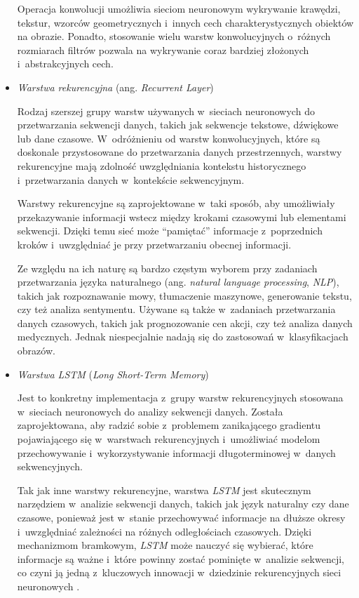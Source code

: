 \begin{itemize}
        Operacja konwolucji umożliwia sieciom neuronowym wykrywanie krawędzi, tekstur, wzorców geometrycznych i~innych cech charakterystycznych obiektów na obrazie.
        Ponadto, stosowanie wielu warstw konwolucyjnych o~różnych rozmiarach filtrów pozwala na wykrywanie coraz bardziej złożonych i~abstrakcyjnych cech.

  \item \emph{Warstwa rekurencyjna} (ang. \emph{Recurrent Layer})

        Rodzaj szerszej grupy warstw używanych w~sieciach neuronowych do przetwarzania sekwencji danych, takich jak sekwencje tekstowe, dźwiękowe lub dane czasowe.
        W~odróżnieniu od warstw konwolucyjnych, które są doskonale przystosowane do przetwarzania danych przestrzennych, warstwy rekurencyjne mają zdolność uwzględniania kontekstu historycznego i~przetwarzania danych w~kontekście sekwencyjnym.

        Warstwy rekurencyjne są zaprojektowane w~taki sposób, aby umożliwiały przekazywanie informacji wstecz między krokami czasowymi lub elementami sekwencji.
        Dzięki temu sieć może ``pamiętać'' informacje z~poprzednich kroków i~uwzględniać je przy przetwarzaniu obecnej informacji.

        Ze względu na ich naturę są bardzo częstym wyborem przy zadaniach przetwarzania języka naturalnego (ang. \emph{natural language processing}, \emph{NLP}), takich jak rozpoznawanie mowy, tłumaczenie maszynowe, generowanie tekstu, czy też analiza sentymentu.
        Używane są także w~zadaniach przetwarzania danych czasowych, takich jak prognozowanie cen akcji, czy też analiza danych medycznych.
        Jednak niespecjalnie nadają się do zastosowań w~klasyfikacjach obrazów.

  \item \emph{Warstwa LSTM} (\emph{Long Short-Term Memory})

        Jest to konkretny implementacja z~grupy warstw rekurencyjnych stosowana w~sieciach neuronowych do analizy sekwencji danych.
        Została zaprojektowana, aby radzić sobie z~problemem zanikającego gradientu pojawiającego się w~warstwach rekurencyjnych i~umożliwiać modelom przechowywanie i~wykorzystywanie informacji długoterminowej w~danych sekwencyjnych.

        Tak jak inne warstwy rekurencyjne, warstwa \emph{LSTM} jest skutecznym narzędziem w~analizie sekwencji danych, takich jak język naturalny czy dane czasowe, ponieważ jest w~stanie przechowywać informacje na dłuższe okresy i~uwzględniać zależności na różnych odległościach czasowych.
        Dzięki mechanizmom bramkowym, \emph{LSTM} może nauczyć się wybierać, które informacje są ważne i~które powinny zostać pominięte w~analizie sekwencji, co czyni ją jedną z~kluczowych innowacji w~dziedzinie rekurencyjnych sieci neuronowych \cite{staudemeyer2019understanding}.


\end{itemize}

